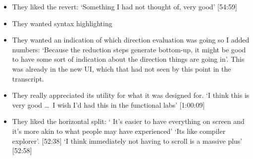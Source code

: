 \begin{itemize}
    \item They liked the revert: `Something I had not thought of, very good' [54:59]
    \item They wanted syntax highlighting
    \item They wanted an indication of which direction evaluation was going so I added numbers: `Because the reduction steps generate bottom-up, it might be good to have some sort of indication about the direction things are going in'. This was already in the new UI, which that had not seen by this point in the transcript.
    \item They really appreciated its utility for what it was designed for. `I think this is very good \ldots\ I wish I'd had this in the functional labs' [1:00:09]
\end{itemize}

\begin{itemize}
    \item They liked the horizontal split: ` It's easier to have everything on screen and it's more akin to what people may have experienced' `Its like compiler explorer'. [52:38] `I think immediately not having to scroll is a massive plus' [52:58]
\end{itemize}